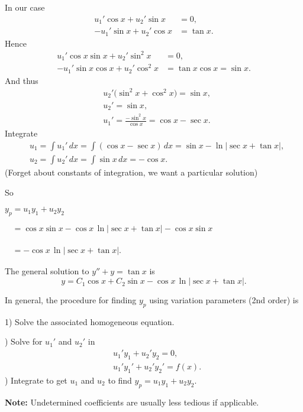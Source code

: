 \documentclass[10pt,aspectratio=169]{beamer}
\begin{document}
\begin{frame}
In our case
\[
\begin{aligned}
u_1' \cos x + u_2' \sin x &= 0 ,\\
-u_1' \sin x + u_2' \cos x &= \tan x .
\end{aligned}
\]
\pause
Hence
\[
\begin{aligned}
u_1' \cos x \sin x + u_2' \sin^2 x & = 0 ,\\
-u_1' \sin x \cos x + u_2' \cos^2 x & = \tan x \cos x = \sin x .
\end{aligned}
\]
\pause
And thus
\[
\begin{aligned}
& u_2' \bigl(\sin^2 x + \cos^2 x\bigr) = \sin x , \\
& u_2' = \sin x , \\
& u_1' = \frac{- \sin^2 x}{\cos x} = \cos x - \sec x .
\end{aligned}
\]
\pause
Integrate %
\[
\begin{aligned}
& u_1 = \int u_1'\,dx 
= \int ( \cos x-\sec x ) \,dx
= \sin x -
\ln \left\lvert \sec x + \tan x \right\rvert
, \\
& u_2 = \int u_2'\,dx 
= \int \sin x\,dx = -\cos x .
\end{aligned}
\]
\pause
(Forget about constants of integration, we want a particular solution)

\end{frame}

\begin{frame}
So

\medskip

\quad
$
y_p = u_1 y_1 + u_2 y_2$

\pause
\medskip

\quad
$
\phantom{y_p}
=
\cos x \sin x
-
\cos x
\,
\ln \lvert
\sec x + \tan x
\rvert
-\cos x \sin x
$

\pause
\medskip

\quad
$
\phantom{y_p}
=
-
\cos x \, \ln \lvert
\sec x + \tan x
\rvert $.

\pause
\medskip

The general solution to $y'' + y = \tan x$ is
\[
y = C_1 \cos x + C_2 \sin x
-
\cos x \, \ln \lvert
\sec x + \tan x
\rvert .
\]

\medskip
\pause

In general, the procedure for finding $y_p$ using variation parameters (2nd
order) is

1) Solve the associated homogeneous equation.

) Solve for $u_1'$ and $u_2'$ in
\[
\begin{aligned}
& u_1' y_1 + u_2' y_2 = 0 ,\\
& u_1' y_1' + u_2' y_2' = f(x) .
\end{aligned}
\]
) Integrate to get $u_1$ and $u_2$ to find $y_p = u_1 y_1 + u_2 y_2$.

\medskip
\pause

\textbf{Note:} Undetermined coefficients are usually less tedious if
applicable.
\end{frame}
\end{document}
